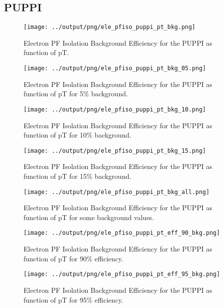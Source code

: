 \documentclass[11pt]{book}
\begin{document}
\subsection{PUPPI}
\begin{figure}[htb]
\centering
\texttt{[image: ../output/png/ele\_pfiso\_puppi\_pt\_bkg.png]}
\caption{Electron PF Isolation Background Efficiency for the PUPPI as function of pT.}
\label{fig:ele_pfiso_pt_bkg_puppi}
\end{figure}

\begin{figure}[htb]
\centering
\texttt{[image: ../output/png/ele\_pfiso\_puppi\_pt\_bkg\_05.png]}
\caption{Electron PF Isolation Background Efficiency for the PUPPI as function of pT for 5\% background.}
\label{fig:ele_pfiso_pt_bkg_puppi_bkg_05}
\end{figure}

\begin{figure}[htb]
\centering
\texttt{[image: ../output/png/ele\_pfiso\_puppi\_pt\_bkg\_10.png]}
\caption{Electron PF Isolation Background Efficiency for the PUPPI as function of pT for 10\% background.}
\label{fig:ele_pfiso_pt_bkg_puppi_bkg_10}
\end{figure}

\begin{figure}[htb]
\centering
\texttt{[image: ../output/png/ele\_pfiso\_puppi\_pt\_bkg\_15.png]}
\caption{Electron PF Isolation Background Efficiency for the PUPPI as function of pT for 15\% background.}
\label{fig:ele_pfiso_pt_bkg_puppi_bkg_15}
\end{figure}

\begin{figure}[htb]
\centering
\texttt{[image: ../output/png/ele\_pfiso\_puppi\_pt\_bkg\_all.png]}
\caption{Electron PF Isolation Background Efficiency for the PUPPI as function of pT for some background values.}
\label{fig:ele_pfiso_pt_bkg_puppi_bkg_all}
\end{figure}

\begin{figure}[htb]
\centering
\texttt{[image: ../output/png/ele\_pfiso\_puppi\_pt\_eff\_90\_bkg.png]}
\caption{Electron PF Isolation Background Efficiency for the PUPPI as function of pT for 90\% efficiency.}
\label{fig:ele_pfiso_pt_eff_puppi_eff_90_bkg}
\end{figure}

\begin{figure}[htb]
\centering
\texttt{[image: ../output/png/ele\_pfiso\_puppi\_pt\_eff\_95\_bkg.png]}
\caption{Electron PF Isolation Background Efficiency for the PUPPI as function of pT for 95\% efficiency.}
\label{fig:ele_pfiso_pt_eff_puppi_eff_95_bkg}
\end{figure}
\end{document}
